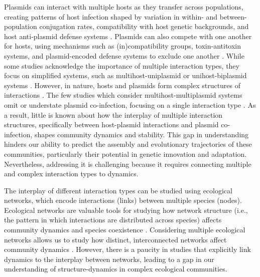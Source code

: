 \documentclass[10pt,letterpaper]{article}
\begin{document}
Plasmids can interact with multiple hosts as they transfer across populations, creating patterns of host infection shaped by variation in within- and between-population conjugation rates, compatibility with host genetic backgrounds, and host anti-plasmid defense systems \cite{Alderliesten2020-hv, Deep2022-ed, Jaskolska2022-ff}. Plasmids can also compete with one another for hosts, using mechanisms such as (in)compatibility groups, toxin-antitoxin systems, and plasmid-encoded defense systems to exclude one another \cite{Novick1987-us, San_Millan2014-ak, Dionisio2019-mh, Cooper2000-kr, Helinski2022-na, Pinilla-Redondo2020-if, Rocha2022-ub}. While some studies acknowledge the importance of multiple interaction types, they focus on simplified systems, such as multihost-uniplasmid \cite{Coyte2022-xx} or unihost-biplasmid systems \cite{Igler2022-lv}. However, in nature, hosts and plasmids form complex structures of interactions \cite{Pilosof2023-kx}. The few studies which consider multihost-multiplasmid systems omit or understate plasmid co-infection, focusing on a single interaction type \cite{Zhu2024-rr, Wang2020-wo, Risely2024-ls}. As a result, little is known about how the interplay of multiple interaction structures, specifically between host-plasmid interactions and plasmid co-infection, shapes community dynamics and stability. This gap in understanding hinders our ability to predict the assembly and evolutionary trajectories of these communities, particularly their potential in genetic innovation and adaptation. Nevertheless, addressing it is challenging because it requires connecting multiple and complex interaction types to dynamics.

The interplay of different interaction types can be studied using ecological networks, which encode interactions (links) between multiple species (nodes). Ecological networks are valuable tools for studying how network structure (i.e., the pattern in which interactions are distributed across species) affects community dynamics and species coexistence \cite{Bastolla2009-xy, Thebault2010-jm}. Considering multiple ecological networks allows us to study how distinct, interconnected networks affect community dynamics \cite{Pilosof2017-sm, Pilosof2019-pu, Pilosof2020-lz, Liaghat2024-oy}. However, there is a paucity in studies that explicitly link dynamics to the interplay between networks, leading to a gap in our understanding of structure-dynamics in complex ecological communities.
\end{document}
